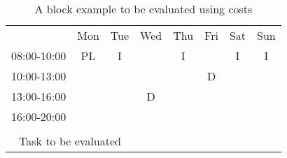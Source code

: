 \begin{table}[!h]
\centering
\caption{A block example to be evaluated using costs}
\label{block_to_evaluate}
\begin{tabular}{cccccccc}
                                 & Mon                                             & Tue                    & Wed                                            & Thu                    & Fri                                            & Sat                    & Sun                    \\ \cline{2-8} 
\multicolumn{1}{c|}{08:00-10:00} & \multicolumn{1}{c|}{\cellcolor[HTML]{FCFF2F}PL} & \multicolumn{1}{c|}{I} & \multicolumn{1}{c|}{}                          & \multicolumn{1}{c|}{I} & \multicolumn{1}{c|}{}                          & \multicolumn{1}{c|}{I} & \multicolumn{1}{c|}{I} \\ \cline{2-8} 
\multicolumn{1}{c|}{10:00-13:00} & \multicolumn{1}{c|}{\cellcolor[HTML]{FCFF2F}}   & \multicolumn{1}{c|}{}  & \multicolumn{1}{c|}{}                          & \multicolumn{1}{c|}{}  & \multicolumn{1}{c|}{\cellcolor[HTML]{FCFF2F}D} &                        &                        \\ \cline{2-6}
\multicolumn{1}{c|}{13:00-16:00} & \multicolumn{1}{c|}{\cellcolor[HTML]{FCFF2F}}   & \multicolumn{1}{c|}{}  & \multicolumn{1}{c|}{\cellcolor[HTML]{FCFF2F}D} & \multicolumn{1}{c|}{}  & \multicolumn{1}{c|}{}                          &                        &                        \\ \cline{2-6}
\multicolumn{1}{c|}{16:00-20:00} & \multicolumn{1}{c|}{}                           & \multicolumn{1}{c|}{}  & \multicolumn{1}{c|}{}                          & \multicolumn{1}{c|}{}  & \multicolumn{1}{c|}{}                          &                        &                        \\ \cline{2-6}
                                 &                                                 &                        &                                                &                        &                                                &                        &                        \\
\multicolumn{3}{c}{Task to be evaluated}                                                                    &                                                &                        &                                                &                        &                        \\

\end{tabular}
\end{table}
